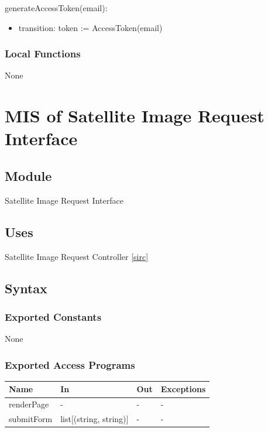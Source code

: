 \documentclass[12pt, titlepage]{article}
\begin{document}
\noindent generateAccessToken(email):
\begin{itemize}
\item transition: token := AccessToken(email)
\end{itemize}

\subsubsection{Local Functions}
None

\section{MIS of Satellite Image Request Interface} \label{siri}

\subsection{Module}

Satellite Image Request Interface

\subsection{Uses}

Satellite Image Request Controller \ref{sirc}

\subsection{Syntax}

\subsubsection{Exported Constants}
None
\subsubsection{Exported Access Programs}

\begin{center}
\begin{tabular}{p{2cm} p{4cm} p{4cm} p{2cm}}
\hline
\textbf{Name} & \textbf{In} & \textbf{Out} & \textbf{Exceptions} \\
\hline
renderPage & - & - & - \\
submitForm & list[(string, string)] & - & - \\
\hline
\end{tabular}
\end{center}
\end{document}
